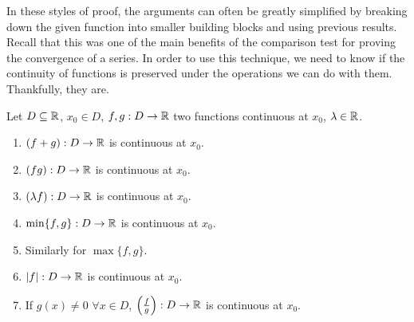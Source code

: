 \documentclass[../real_analysis.tex]{subfiles}
\begin{document}
        In these styles of proof, the arguments can often be greatly simplified by breaking down the given function into smaller building blocks and using previous results. Recall that this was one of the main benefits of the comparison test for proving the convergence of a series. In order to use this technique, we need to know if the continuity of functions is preserved under the operations we can do with them. Thankfully, they are.
        \begin{theorem}\label{cts-func-props}
            Let $D\subseteq\mathbb{R}$, $x_0\in D$, $f, g: D\to\mathbb{R}$ two functions continuous at $x_0$, $\lambda\in\mathbb{R}$.
            \begin{enumerate}[\upshape(i)]
                \item $(f+g): D\to\mathbb{R}$ is continuous at $x_0$.
                \item $(fg): D\to\mathbb{R}$ is continuous at $x_0$.
                \item $(\lambda f): D\to\mathbb{R}$ is continuous at $x_0$.
                \item $\min\{f, g\}: D\to\mathbb{R}$ is continuous at $x_0$.
                \item Similarly for $\max\{f, g\}$.
                \item $\lvert f\rvert: D\to\mathbb{R}$ is continuous at $x_0$.
                \item If $g(x)\neq0$ $\forall x\in D$, $\left(\frac{f}{g}\right): D\to\mathbb{R}$ is continuous at $x_0$.
            \end{enumerate}
        \end{theorem}
\end{document}
